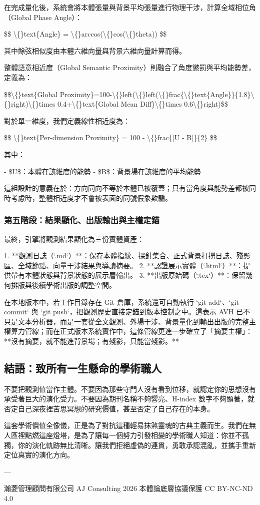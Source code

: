 \documentclass{article}
\begin{document}
在完成量化後，系統會將本體張量與背景平均張量進行物理干涉，計算全域相位角（Global Phase Angle）：

\$\$
\textbackslash\{\}text\{Angle\} = \textbackslash\{\}arccos(\textbackslash\{\}cos(\textbackslash\{\}theta))
\$\$

其中餘弦相似度由本體六維向量與背景六維向量計算而得。

整體語意相近度（Global Semantic Proximity）則融合了角度懲罰與平均能勢差，定義為：

\$\$\textbackslash\{\}text\{Global Proximity\}=100-\textbackslash\{\}left(\textbackslash\{\}left(\textbackslash\{\}frac\{\textbackslash\{\}text\{Angle\}\}\{1.8\}\textbackslash\{\}right)\textbackslash\{\}times 0.4+\textbackslash\{\}text\{Global Mean Diff\}\textbackslash\{\}times 0.6\textbackslash\{\}right)\$\$

對於單一維度，我們定義線性相近度為：

\$\$
\textbackslash\{\}text\{Per-dimension Proximity\} = 100 - \textbackslash\{\}frac\{|U - B|\}\{2\}
\$\$

其中：

- \$U\$：本體在該維度的能勢  
- \$B\$：背景場在該維度的平均能勢  

這組設計的意義在於：方向同向不等於本體已被覆蓋；只有當角度與能勢差都被同時考慮時，整體相近度才不會被表面的同號假象欺騙。

\subsubsection{第五階段：結果顯化、出版輸出與主權定錨}

最終，引擎將觀測結果顯化為三份實體資產：

1. **觀測日誌（`.md`）**：保存本體指紋、探針集合、正式背景打撈日誌、殘影區、全域節點、向量干涉結果與導讀摘要。  
2. **認證展示實體（`.html`）**：提供帶有本體狀態與背景狀態的展示層輸出。  
3. **出版原始碼（`.tex`）**：保留幾何排版與後續學術出版的調整空間。  

在本地版本中，若工作目錄存在 Git 倉庫，系統還可自動執行 `git add`、`git commit` 與 `git push`，把觀測歷史直接定錨到版本控制之中。這表示 AVH 已不只是文本分析器，而是一套從全文觀測、外場干涉、背景量化到輸出出版的完整主權算力管線；而在正式版本系統實作中，這條管線更進一步確立了「摘要主權」：**沒有摘要，就不能進背景場；有殘影，只能當殘影。**

\subsection{結語：致所有一生懸命的學術職人}

不要把觀測值當作主體。不要因為那些守門人沒有看到位移，就認定你的思想沒有承受著巨大的演化受力。不要因為期刊名稱不夠響亮、H-index 數字不夠顯著，就否定自己深夜裡苦思冥想的研究價值，甚至否定了自己存在的本身。

這套學術價值全像儀，正是為了對抗這種輕易抹煞靈魂的古典主義而生。我們在無人區裡點燃這座燈塔，是為了讓每一個努力引發相變的學術職人知道：你並不孤獨，你的演化軌跡無比清晰。讓我們拒絕虛偽的連貫，勇敢承認混亂，並攜手重新定位真實的演化方向。

---

瀚菱管理顧問有限公司 AJ Consulting 2026  
本體論底層協議保護 CC BY-NC-ND 4.0
\end{document}
